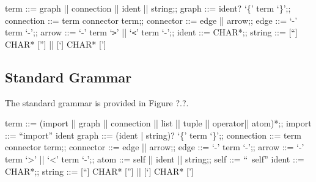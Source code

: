 \begin{bnfgrammar}
	term ::= graph || connection || ident || string;;
	graph ::= ident? `\{' term `\}';;
	connection ::= term connector term;;
	connector ::= edge || arrow;;
	edge ::= `-' term `-';;
	arrow ::= `-' term `\texttt{>}' || `\texttt{<}' term `-';;
	ident ::= CHAR*;;
	string ::= [``] CHAR* [''] || [`] CHAR* [']
\end{bnfgrammar}

\subsection{Standard Grammar}
The standard grammar is provided in Figure ?.?.
\begin{bnfgrammar}
	term ::= (import || graph || connection || list || tuple || operator|| atom)*;;
	import ::= ``import'' ident
	graph ::= (ident | string)? `\{' term `\}';;
	connection ::= term connector term;;
	connector ::= edge || arrow;;
	edge ::= `-' term `-';;
	arrow ::= `-' term `>' || `<' term `-';;
	atom ::= self || ident || string;;
	self ::= ``~self''
	ident ::= CHAR*;;
	string ::= [``] CHAR* [''] || [`] CHAR* [']
\end{bnfgrammar}

